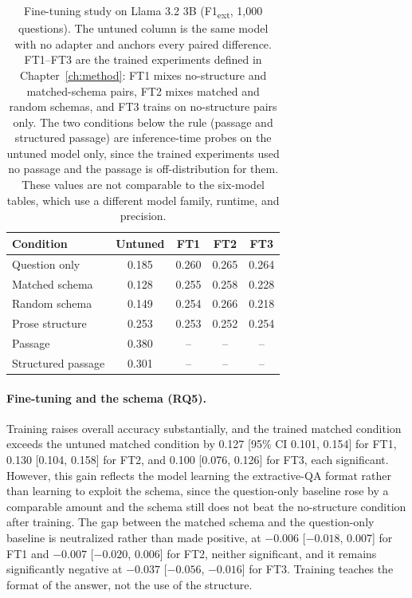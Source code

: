 \documentclass[master]{thesis}
\newcommand{\cref}[1]{Chapter~\ref{#1}}  %
\begin{document}
\begin{table}[h]
\centering
\begin{tabular}{lcccc}
\toprule
Condition & Untuned & FT1 & FT2 & FT3 \\
\midrule
Question only        & 0.185 & 0.260 & 0.265 & 0.264 \\
Matched schema       & 0.128 & 0.255 & 0.258 & 0.228 \\
Random schema        & 0.149 & 0.254 & 0.266 & 0.218 \\
Prose structure      & 0.253 & 0.253 & 0.252 & 0.254 \\
\midrule
Passage              & 0.380 & --    & --    & --    \\
Structured passage   & 0.301 & --    & --    & --    \\
\bottomrule
\end{tabular}
\caption{Fine-tuning study on Llama 3.2 3B (F1\textsubscript{ext}, 1,000 questions). The untuned column is the same model with no adapter and anchors every paired difference. FT1--FT3 are the trained experiments defined in \cref{ch:method}: FT1 mixes no-structure and matched-schema pairs, FT2 mixes matched and random schemas, and FT3 trains on no-structure pairs only. The two conditions below the rule (passage and structured passage) are inference-time probes on the untuned model only, since the trained experiments used no passage and the passage is off-distribution for them. These values are not comparable to the six-model tables, which use a different model family, runtime, and precision.}
\label{tab:finetune}
\end{table}

\paragraph{Fine-tuning and the schema (RQ5).}
Training raises overall accuracy substantially, and the trained matched condition exceeds the untuned matched condition by 0.127 [95\% CI 0.101, 0.154] for FT1, 0.130 [0.104, 0.158] for FT2, and 0.100 [0.076, 0.126] for FT3, each significant. However, this gain reflects the model learning the extractive-QA format rather than learning to exploit the schema, since the question-only baseline rose by a comparable amount and the schema still does not beat the no-structure condition after training. The gap between the matched schema and the question-only baseline is neutralized rather than made positive, at $-0.006$ [$-0.018$, 0.007] for FT1 and $-0.007$ [$-0.020$, 0.006] for FT2, neither significant, and it remains significantly negative at $-0.037$ [$-0.056$, $-0.016$] for FT3. Training teaches the format of the answer, not the use of the structure.
\end{document}
